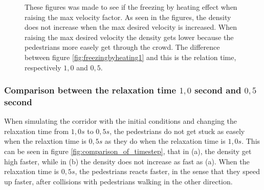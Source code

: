 \begin{figure}[h]
\centering
{}
\caption{These figures was made to see if the freezing by heating effect when raising the max velocity factor. As seen in the figures, the
density does not increase when the max desired velocity is increased. When raising the max desired velocity the density gets lower because
the pedestrians more easely get through the crowd. The difference between figure \ref{fig:freezingbyheating1} and this is the relation time,
respectively $1,0$ and $0,5$.}
\label{fig:freezingbyheating05}
\end{figure}

\subsubsection{Comparison between the relaxation time $1,0$ second and $0,5$ second}
When simulating the corridor with the initial conditions and changing the relaxation time from $1,0 s$ to $0,5 s$,
the pedestrians do not get stuck as easely when the relaxtion time is $0,5 s$ as they do when the relaxation time
is $1,0 s$. This can be seen in figure \ref{fig:comparison_of_timestep}, that in (a), the density get high faster,
while in (b) the density does not increase as fast as (a).
When the relaxation time is $0,5 s$, the pedestrians reacts faster, in the sense that they speed up faster,
after collisions with pedestrians walking in the other direction.

